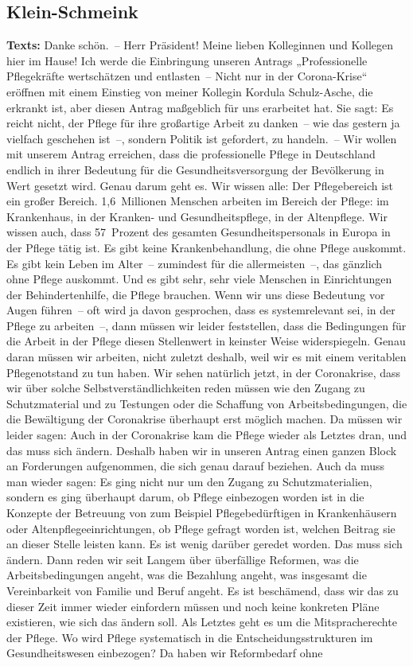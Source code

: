 \documentclass{article}
\begin{document}
\subsection{Klein-Schmeink}
\noindent\textbf{Texts:} Danke schön. – Herr Präsident! Meine lieben Kolleginnen und Kollegen hier im Hause! Ich werde die Einbringung unseren Antrags „Professionelle Pflegekräfte wertschätzen und entlasten – Nicht nur in der Corona-Krise“ eröffnen mit einem Einstieg von meiner Kollegin Kordula Schulz-Asche, die erkrankt ist, aber diesen Antrag maßgeblich für uns erarbeitet hat. Sie sagt: Es reicht nicht, der Pflege für ihre großartige Arbeit zu danken – wie das gestern ja vielfach geschehen ist –, sondern Politik ist gefordert, zu handeln. – Wir wollen mit unserem Antrag erreichen, dass die professionelle Pflege in Deutschland endlich in ihrer Bedeutung für die Gesundheitsversorgung der Bevölkerung in Wert gesetzt wird.  Genau darum geht es. Wir wissen alle: Der Pflegebereich ist ein großer Bereich. 1,6 Millionen Menschen arbeiten im Bereich der Pflege: im Krankenhaus, in der Kranken- und Gesundheitspflege, in der Altenpflege. Wir wissen auch, dass 57 Prozent des gesamten Gesundheitspersonals in Europa in der Pflege tätig ist. Es gibt keine Krankenbehandlung, die ohne Pflege auskommt. Es gibt kein Leben im Alter – zumindest für die allermeisten –, das gänzlich ohne Pflege auskommt. Und es gibt sehr, sehr viele Menschen in Einrichtungen der Behindertenhilfe, die Pflege brauchen. Wenn wir uns diese Bedeutung vor Augen führen – oft wird ja davon gesprochen, dass es systemrelevant sei, in der Pflege zu arbeiten –, dann müssen wir leider feststellen, dass die Bedingungen für die Arbeit in der Pflege diesen Stellenwert in keinster Weise widerspiegeln. Genau daran müssen wir arbeiten, nicht zuletzt deshalb, weil wir es mit einem veritablen Pflegenotstand zu tun haben.  Wir sehen natürlich jetzt, in der Coronakrise, dass wir über solche Selbstverständlichkeiten reden müssen wie den Zugang zu Schutzmaterial und zu Testungen oder die Schaffung von Arbeitsbedingungen, die die Bewältigung der Coronakrise überhaupt erst möglich machen. Da müssen wir leider sagen: Auch in der Coronakrise kam die Pflege wieder als Letztes dran, und das muss sich ändern.  Deshalb haben wir in unseren Antrag einen ganzen Block an Forderungen aufgenommen, die sich genau darauf beziehen. Auch da muss man wieder sagen: Es ging nicht nur um den Zugang zu Schutzmaterialien, sondern es ging überhaupt darum, ob Pflege einbezogen worden ist in die Konzepte der Betreuung von zum Beispiel Pflegebedürftigen in Krankenhäusern oder Altenpflegeeinrichtungen, ob Pflege gefragt worden ist, welchen Beitrag sie an dieser Stelle leisten kann. Es ist wenig darüber geredet worden. Das muss sich ändern.  Dann reden wir seit Langem über überfällige Reformen, was die Arbeitsbedingungen angeht, was die Bezahlung angeht, was insgesamt die Vereinbarkeit von Familie und Beruf angeht. Es ist beschämend, dass wir das zu dieser Zeit immer wieder einfordern müssen und noch keine konkreten Pläne existieren, wie sich das ändern soll.  Als Letztes geht es um die Mitspracherechte der Pflege. Wo wird Pflege systematisch in die Entscheidungsstrukturen im Gesundheitswesen einbezogen? Da haben wir Reformbedarf ohne 
\end{document}
